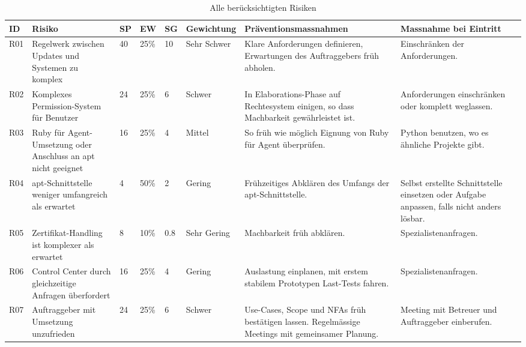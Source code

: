 \begin{landscape}
\begin{table}[H]
\caption{Alle berücksichtigten Risiken}
\label{tab:risikoanalyse}
\begin{tabular}{|l|p{4cm}|l|l|l|l|p{5cm}|p{5cm}|}
\hline
ID  & Risiko                                                        & SP\footnotemark[1] & EW\footnotemark[2]   & SG\footnotemark[3]  & Gewichtung                          & Präventionsmassnahmen                                                                            & Massnahme bei Eintritt                                                                     \\ \hline
R01 & Regelwerk zwischen Updates und Systemen zu komplex            & 40 & 25\% & 10  & \cellcolor[HTML]{FE0000}Sehr Schwer & Klare Anforderungen definieren, Erwartungen des Auftraggebers früh abholen.                      & Einschränken der Anforderungen.                                                            \\
R02 & Komplexes Permission-System für Benutzer                      & 24 & 25\% & 6   & \cellcolor[HTML]{FD6864}Schwer      & In Elaborations-Phase auf Rechtesystem einigen, so dass Machbarkeit gewährleistet ist.           & Anforderungen einschränken oder komplett weglassen.                                        \\
R03 & Ruby für Agent-Umsetzung oder Anschluss an apt nicht geeignet & 16 & 25\% & 4   & \cellcolor[HTML]{FFCB2F}Mittel      & So früh wie möglich Eignung von Ruby für Agent überprüfen.                                       & Python benutzen, wo es ähnliche Projekte gibt.                                             \\
R04 & apt-Schnittstelle weniger umfangreich als erwartet            & 4  & 50\% & 2   & \cellcolor[HTML]{009901}Gering      & Frühzeitiges Abklären des Umfangs der apt-Schnittstelle.                                         & Selbst erstellte Schnittstelle einsetzen oder Aufgabe anpassen, falls nicht anders lösbar. \\
R05 & Zertifikat-Handling ist komplexer als erwartet                & 8  & 10\% & 0.8 & \cellcolor[HTML]{34FF34}Sehr Gering & Machbarkeit früh abklären.                                                                       & Spezialisten\footnotemark[4] anfragen. \\
R06 & Control Center durch gleichzeitige Anfragen überfordert       & 16 & 25\% & 4   & \cellcolor[HTML]{009901}Gering      & Auslastung einplanen, mit erstem stabilem Prototypen Last-Tests fahren.                   & Spezialisten\footnotemark[4] anfragen. \\
R07 & Auftraggeber mit Umsetzung unzufrieden                        & 24 & 25\% & 6   & \cellcolor[HTML]{FD6864}Schwer      & Use-Cases, Scope und NFAs früh bestätigen lassen. Regelmässige Meetings mit gemeinsamer Planung. & Meeting mit Betreuer und Auftraggeber einberufen.                                          \\ \hline
\end{tabular}
\end{table}



\end{landscape}
